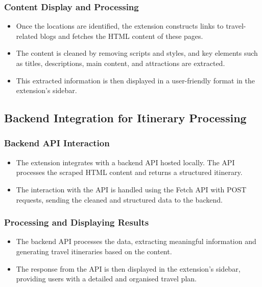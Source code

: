 \documentclass[conference]{IEEEtran}
\begin{document}
        \subsubsection{Content Display and Processing}
        \begin{itemize}
            \item Once the locations are identified, the extension constructs links to travel-related blogs and fetches the HTML content of these pages.
            \item The content is cleaned by removing scripts and styles, and key elements such as titles, descriptions, main content, and attractions are extracted.
            \item This extracted information is then displayed in a user-friendly format in the extension’s sidebar.
        \end{itemize}

    \subsection{Backend Integration for Itinerary Processing}

        \subsubsection{Backend API Interaction}
        \begin{itemize}
            \item The extension integrates with a backend API hosted locally. The API processes the scraped HTML content and returns a structured itinerary.
            \item The interaction with the API is handled using the Fetch API with POST requests, sending the cleaned and structured data to the backend.
        \end{itemize}

        \subsubsection{Processing and Displaying Results}
        \begin{itemize}
            \item The backend API processes the data, extracting meaningful information and generating travel itineraries based on the content.
            \item The response from the API is then displayed in the extension’s sidebar, providing users with a detailed and organised travel plan.
        \end{itemize}
\end{document}
